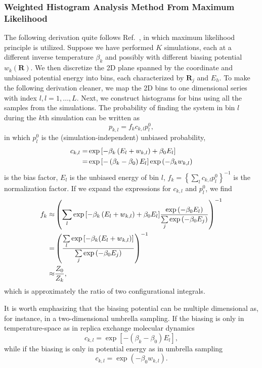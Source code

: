 \subsubsection{Weighted Histogram Analysis Method From Maximum Likelihood}
The following derivation quite follows Ref.~\cite{GallicchioJPCB2005}, in which maximum likelihood principle is utilized. 
Suppose we have performed $K$ simulations, each at a different inverse temperature $\beta_k$ and possibly with different biasing potential $w_k(\mathbf{R})$.
We then discretize the 2D plane spanned by the coordinate and unbiased potential energy into bins, each characterized by ${\mathbf{R}_j}$ and ${E_h}$. To make the following derivation cleaner, we map the 2D bins to one dimensional series with index $l, l=1,\dots,L$. Next, we construct histograms for bins using all the samples from the simulations. The probability of finding the system in bin $l$ during the $k$th simulation can be written as
\begin{equation}
p_{k,l}=f_kc_{k,l}p_l^0,
\label{Eq:FEM:WHAM:unbiasingProb}
\end{equation}
in which $p_l^0$ is the (simulation-independent) unbiased probability,
\begin{align}
c_{k,l}=&\exp{\left[-\beta_k\left(E_l+w_{k,l}\right)+\beta_0E_l\right]}\notag\\
=&\exp{\left[-\left(\beta_k-\beta_0\right)E_l\right]}\exp{\left(-\beta_kw_{k,l}\right)}
\end{align}
is the bias factor, $E_l$ is the unbiased energy of bin $l$, $f_k={\left\{\sum\limits_lc_{k,l}p_l^0\right\}}^{-1}$ is the normalization factor. If we expand the expressions for $c_{k,l}$ and $p_l^0$, we find
\begin{align}
	f_k\approx&\left(\sum\limits_l \exp{\left[-\beta_k\left(E_l+w_{k,l}\right)+\beta_0E_l\right]} \frac{\exp{(-\beta_0 E_l)}}{\sum\limits_j\exp{(-\beta_0 E_j)}}\right)^{-1}\notag\\
	   =&\left(\frac{\sum\limits_l\exp{\left[-\beta_k(E_l+w_{k,l})\right]}}{\sum\limits_j\exp{(-\beta_0 E_j)}}\right)^{-1}\notag\\
	   \approx&\frac{Z_0}{Z_k},
\end{align}
which is approximately the ratio of two configurational integrals.

It is worth emphasizing that the biasing potential can be multiple dimensional as, for instance, in a two-dimensional umbrella sampling.
If the biasing is only in temperature-space as in replica exchange molecular dynamics
\begin{equation}
c_{k,l}=\exp{\left[-\left(\beta_k-\beta_0\right)E_l\right]},
\end{equation} 
while if the biasing is only in potential energy as in umbrella sampling
\begin{equation}
c_{k,l}=\exp{\left(-\beta_0w_{k,l}\right)}.
\end{equation}

